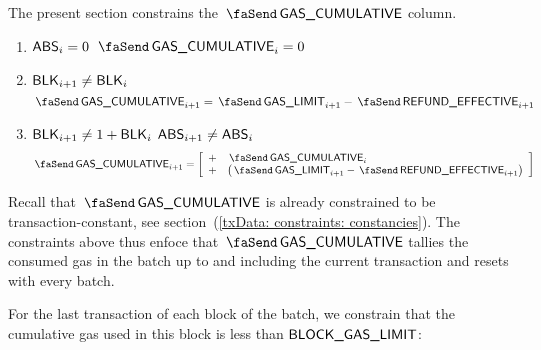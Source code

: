 The present section constrains the $\txCumulativeConsumedGas$ column. 
\begin{enumerate}
	\item \If $\textsf{ABS}_{i} = 0$ \Then $\txCumulativeConsumedGas_{i} = 0$
	\item \If $\textsf{BLK}_{i + 1} \neq \textsf{BLK}_{i}$ \Then
		\[ \txCumulativeConsumedGas_{i + 1} = \txGasLimit_{i + 1} - \txEffectiveRefund_{i + 1} \]
	\item \If $\textsf{BLK}_{i + 1} \neq 1 + \textsf{BLK}_{i}$ \et $\textsf{ABS}_{i + 1} \neq \textsf{ABS}_{i}$ \Then
		\[
			\txCumulativeConsumedGas_{i + 1} 
			=
			\left[ \begin{array}{ll}
				+ & \txCumulativeConsumedGas_{i}                           \\
				+ & \big(\txGasLimit_{i + 1} - \txEffectiveRefund_{i + 1}\big) \\
			\end{array}\right]
		\]
\end{enumerate}
Recall that $\txCumulativeConsumedGas$ is already constrained to be transaction-constant, see section~(\ref{txData: constraints: constancies}). The constraints above thus enfoce that $\txCumulativeConsumedGas$ tallies the consumed gas in the batch up to and including the current transaction and resets with every batch.

For the last transaction of each block of the batch, we constrain that the cumulative gas used in this block is less than $\textsf{BLOCK\_GAS\_LIMIT}$:


